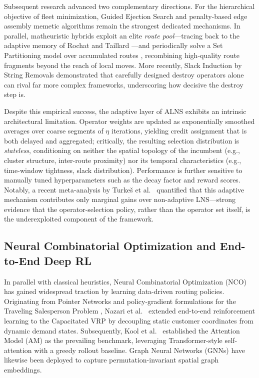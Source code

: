 \documentclass{ieeeaccess}
\begin{document}
Subsequent research advanced two complementary directions. For the
hierarchical objective of fleet minimization, Guided Ejection Search
\cite{nagata2009ges} and penalty-based edge assembly memetic algorithms
\cite{nagata2010srex} remain the strongest dedicated mechanisms. In parallel,
matheuristic hybrids exploit an elite \emph{route pool}---tracing back to the
adaptive memory of Rochat and Taillard \cite{rochat1995probabilistic}---and
periodically solve a Set Partitioning model over accumulated routes
\cite{alvarenga2007genetic, subramanian2013hybrid, vidal2013hybrid},
recombining high-quality route fragments beyond the reach of local moves.
More recently, Slack Induction by String Removals \cite{christiaens2020slack}
demonstrated that carefully designed destroy operators alone can rival far
more complex frameworks, underscoring how decisive the destroy step is.

Despite this empirical success, the adaptive layer of ALNS exhibits an
intrinsic architectural limitation. Operator weights are updated as
exponentially smoothed averages over coarse segments of $\eta$ iterations,
yielding credit assignment that is both delayed and aggregated; critically,
the resulting selection distribution is \emph{stateless}, conditioning on
neither the spatial topology of the incumbent (e.g., cluster structure,
inter-route proximity) nor its temporal characteristics (e.g., time-window
tightness, slack distribution). Performance is further sensitive to manually
tuned hyperparameters such as the decay factor and reward scores. Notably, a
recent meta-analysis by Turke\v{s} et al.\ \cite{turkes2021meta} quantified
that this adaptive mechanism contributes only marginal gains over
non-adaptive LNS---strong evidence that the operator-selection policy, rather
than the operator set itself, is the underexploited component of the
framework.

\subsection{Neural Combinatorial Optimization and End-to-End Deep RL}
\label{sec:rw_nco}

In parallel with classical heuristics, Neural Combinatorial Optimization (NCO)
has gained widespread traction by learning data-driven routing policies.
Originating from Pointer Networks \cite{vinyals2015pointer} and policy-gradient
formulations for the Traveling Salesperson Problem \cite{bello2016neural},
Nazari et al.\ \cite{nazari2018reinforcement} extended end-to-end reinforcement
learning to the Capacitated VRP by decoupling static customer coordinates from
dynamic demand states. Subsequently, Kool et al.\ \cite{kool2019attention}
established the Attention Model (AM) as the prevailing benchmark, leveraging
Transformer-style self-attention with a greedy rollout baseline. Graph Neural
Networks (GNNs) \cite{khalil2017learning, joshi2019efficient} have likewise been
deployed to capture permutation-invariant spatial graph embeddings.
\end{document}
